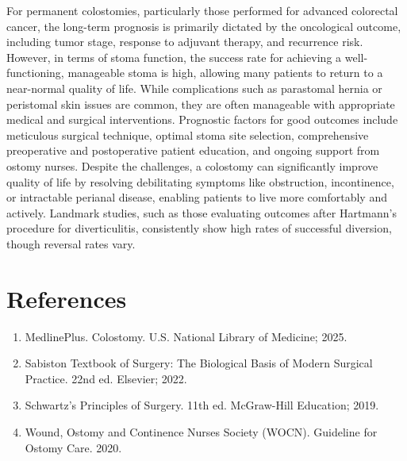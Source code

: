 For permanent colostomies, particularly those performed for advanced colorectal cancer, the long-term prognosis is primarily dictated by the oncological outcome, including tumor stage, response to adjuvant therapy, and recurrence risk. However, in terms of stoma function, the success rate for achieving a well-functioning, manageable stoma is high, allowing many patients to return to a near-normal quality of life. While complications such as parastomal hernia or peristomal skin issues are common, they are often manageable with appropriate medical and surgical interventions. Prognostic factors for good outcomes include meticulous surgical technique, optimal stoma site selection, comprehensive preoperative and postoperative patient education, and ongoing support from ostomy nurses. Despite the challenges, a colostomy can significantly improve quality of life by resolving debilitating symptoms like obstruction, incontinence, or intractable perianal disease, enabling patients to live more comfortably and actively. Landmark studies, such as those evaluating outcomes after Hartmann's procedure for diverticulitis, consistently show high rates of successful diversion, though reversal rates vary.

\section*{References}
\begin{enumerate}
  \item MedlinePlus. Colostomy. U.S. National Library of Medicine; 2025.
  
  \item Sabiston Textbook of Surgery: The Biological Basis of Modern Surgical Practice. 22nd ed. Elsevier; 2022.
  
  \item Schwartz's Principles of Surgery. 11th ed. McGraw-Hill Education; 2019.
  
  \item Wound, Ostomy and Continence Nurses Society (WOCN). Guideline for Ostomy Care. 2020.
\end{enumerate}

\clearpage
